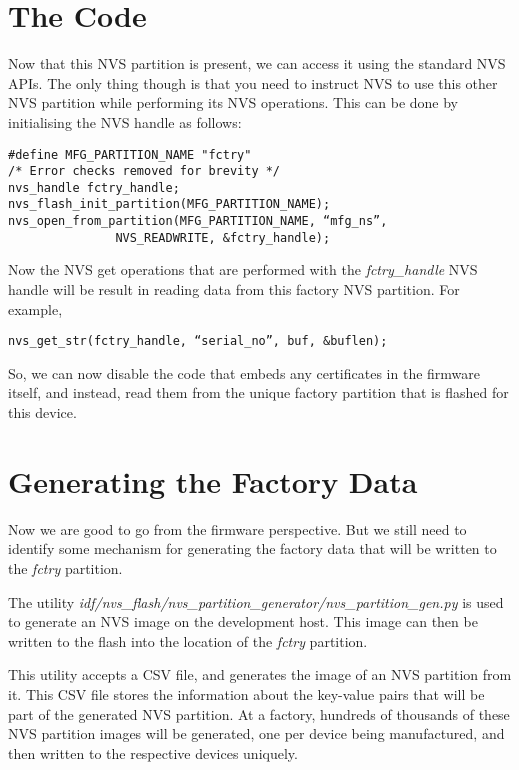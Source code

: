 \documentclass[main.tex]{subfiles}
\begin{document}
\section{The Code}
Now that this NVS partition is present, we can access it using the standard NVS APIs. The only thing though is that you need to instruct NVS to use this other NVS partition while performing its NVS operations. This can be done by initialising the NVS handle as follows:

\begin{verbatim}
#define MFG_PARTITION_NAME "fctry"
/* Error checks removed for brevity */
nvs_handle fctry_handle;
nvs_flash_init_partition(MFG_PARTITION_NAME);
nvs_open_from_partition(MFG_PARTITION_NAME, “mfg_ns”,  
               NVS_READWRITE, &fctry_handle);
\end{verbatim}

Now the NVS get operations that are performed with the \textit{fctry\_handle} NVS handle will be result in reading data from this factory NVS partition. For example,

\begin{verbatim}
nvs_get_str(fctry_handle, “serial_no”, buf, &buflen);
\end{verbatim}

So, we can now disable the code that embeds any certificates in the firmware itself, and instead, read them from the unique factory partition that is flashed for this device.

\section{Generating the Factory Data}
Now we are good to go from the firmware perspective. But we still need to identify some mechanism for generating the factory data that will be written to the \textit{fctry} partition.

The utility \textit{idf/nvs\_flash/nvs\_partition\_generator/nvs\_partition\_gen.py} is used to generate an NVS image on the development host. This image can then be written to the flash into the location of the \textit{fctry} partition.

This utility accepts a CSV file, and generates the image of an NVS partition from it. This CSV file stores the information about the key-value pairs that will be part of the generated NVS partition. At a factory, hundreds of thousands of these NVS partition images will be generated, one per device being manufactured, and then written to the respective devices uniquely.
\end{document}
